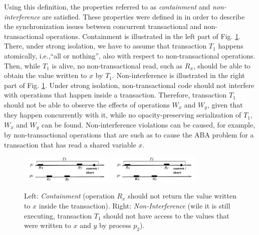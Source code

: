 Using this definition, the properties referred to as
{\it containment}  and {\it non-interference} are satisfied.
These properties were defined in \cite{blundell06} in order to describe
the synchronization issues between concurrent transactional and non-transactional operations.
Containment is   illustrated in  the  left  part of  Fig.
\ref{fig:int-nonc}.  There,
under strong  isolation, we have  to assume that transaction  $T_1$ happens
atomically,  
i.e.,``all  or  nothing'',   also  with  respect  to  non-transactional
operations. Then, while $T_1$ is  alive, no non-transactional read, such as
$R_x$, should be  
able to obtain  the value written to $x$  by $T_1$. Non-interference
is  illustrated  in  the right part of Fig.  \ref{fig:int-nonc}.  
Under  strong  isolation, non-transactional  
code   should  not  interfere   with  operations   that  happen   inside  a
transaction. Therefore, transaction $T_1$ should not be able to observe the
effects of  operations $W_x$ and $W_y$, given that they happen concurrently with it, 
while no opacity-preserving serialization of $T_1$, $W_x$ and $W_y$ can be found. 
Non-interference violations can be caused, for example,  by non-transactional 
operations that are such as to cause the ABA problem for a transaction that has 
read a shared variable $x$.

\begin{figure}[ht]
\centerline{
     \mbox{\includegraphics[width=0.4\textwidth]{SI/imgs/non_containment}}     
    \mbox{\includegraphics[width=0.4\textwidth]{SI/imgs/interference}}
}
\caption{Left:  {\it Containment}  (operation $R_x$  should not  return the
    value written to $x$ inside the transaction). 
Right:  {\it  Non-Interference} (wile  it is still  executing, transaction
$T_1$ should not have access to the values that were written to $x$ and $y$
by process $p_2$).} 
\label{fig:int-nonc}
\end{figure}


